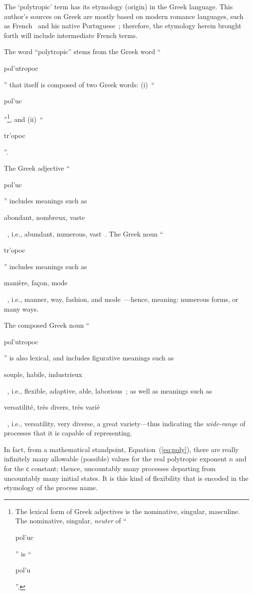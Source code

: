\documentclass[fleqn,11pt]{SelfArx}
\newcommand{\GRtxt}[1]{\begin{otherlanguage}{greek}{{#1}}\end{otherlanguage}}
\newcommand{\FRtxt}[1]{\begin{otherlanguage}{french}{{#1}}\end{otherlanguage}}
\begin{document}
    The `polytropic' term has its etymology  (origin)  in  the  Greek  language.  This  author's
    sources   on   Greek   are   mostly   based   on   modern   romance   languages,   such   as
    French~\cite{1968-Chantraine-Klincksieck,    2000-BaillyA-Hachette}    and    his     native
    Portuguese~\cite{1997-ManiatoglouMPF-Porto}; therefore, the etymology herein  brought  forth
    will include intermediate French terms.

    The word ``polytropic'' stems from the Greek word  ``\GRtxt{pol'utropoc}''  that  itself  is
    composed of two Greek  words:  (i)~``\GRtxt{pol'uc}''\footnote{The  lexical  form  of  Greek
    adjectives is the nominative, singular, masculine. The nominative,  singular,  \emph{neuter}
    of ``\GRtxt{pol'uc}'' is ``\GRtxt{pol'u}''.}, and (ii)~``\GRtxt{tr'opoc}''.

    The Greek adjective  ``\GRtxt{pol'uc}''  includes  meanings  such  as  \FRtxt{\og  abondant,
    nombreux,   vaste   \fg}~\cite{1968-Chantraine-Klincksieck},   i.e.,   abundant,   numerous,
    vast~\cite{2009-BarrierMA+ViviesC-Auzou,  2011-SilvaASM-WMFMartinsFontes}.  The  Greek  noun
    ``\GRtxt{tr'opoc}''  includes   meanings   such   as   \FRtxt{\og   manière,   façon,   mode
    \fg}~\cite{2000-BaillyA-Hachette},      i.e.,      manner,      way,      fashion,       and
    mode~\cite{2009-BarrierMA+ViviesC-Auzou,  2011-SilvaASM-WMFMartinsFontes}---hence,  meaning:
    numerous forms, or many ways.

    The composed Greek noun ``\GRtxt{pol'utropoc}'' is also  lexical,  and  includes  figurative
    meanings such as \FRtxt{\og souple, habile,  industrieux  \fg}~\cite{2000-BaillyA-Hachette},
    i.e., flexible, adaptive, able, laborious~\cite{2011-SilvaASM-WMFMartinsFontes}; as well  as
    meanings    such    as    \FRtxt{\og    versatilité,     très     divers,     très     varié
    \fg}~\cite{2000-BaillyA-Hachette}, i.e., versatility, very diverse, a  great  variety---thus
    indicating the \emph{wide-range} of processes that it is capable of representing.

    In  fact,  from  a  mathematical  standpoint,  Equation~(\ref{eq:poly}),  there  are  really
    infinitely many allowable (possible) values for the real polytropic exponent $n$ and for the
    $\mathsf{c}$ constant; thence, uncountably many processes departing  from  uncountably  many
    initial states. It is this kind of flexibility that is  encoded  in  the  etymology  of  the
    process name.
\end{document}
